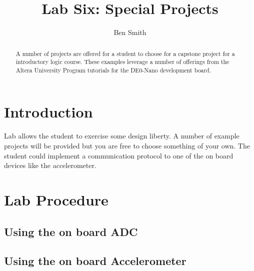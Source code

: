 \title{Lab Six: Special Projects}
\author{Ben Smith}




  \maketitle
    \begin{abstract}
      A number of projects are offered for a student to choose for a capstone project for a introductory logic course. These examples leverage a number of offerings from the Altera University Program tutorials for the DE0-Nano development board.
    \end{abstract}

  \section{\bfseries Introduction}
     Lab allows the student to exercise some design liberty. A number of example projects will be provided but you are free to choose something of your own. The student could implement a communication protocol to one of the on board devices like the accelerometer.

  \section{\bfseries Lab Procedure}

    \subsection{Using the on board ADC}
    \subsection{Using the on board Accelerometer}
